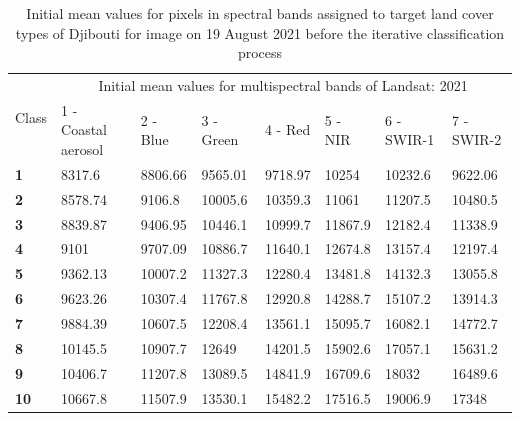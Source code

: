 \documentclass[jimaging,article,submit,pdftex,moreauthors]{Definitions/mdpi}
\begin{document}
\begin{table}[H]
  \centering
  \begin{tabularx}{\textwidth}{p{0.7cm}p{2.5cm}p{1.0cm}p{1.3cm}p{1.0cm}p{1.0cm}p{1.5cm}p{1.5cm}}
  \toprule
  \multirow{2}{*}{Class} & \multicolumn{7}{c}{Initial mean values for multispectral bands of Landsat: 2021} \\
     & 1 - Coastal aerosol & 2 - Blue & 3 - Green & 4 - Red & 5 - NIR & 6 - SWIR-1 & 7 - SWIR-2 \\
    \midrule
    \textbf{1} & 8317.6 & 8806.66 & 9565.01 & 9718.97 & 10254 & 10232.6 & 9622.06 \\
    \textbf{2} & 8578.74 & 9106.8 & 10005.6 & 10359.3 & 11061 & 11207.5 & 10480.5 \\
    \textbf{3} & 8839.87 & 9406.95 & 10446.1 & 10999.7 & 11867.9 & 12182.4 & 11338.9 \\
    \textbf{4} & 9101 & 9707.09 & 10886.7 & 11640.1 & 12674.8 & 13157.4 & 12197.4 \\
    \textbf{5} & 9362.13 &10007.2 & 11327.3 & 12280.4 & 13481.8 & 14132.3 & 13055.8 \\
    \textbf{6} & 9623.26 & 10307.4 & 11767.8 & 12920.8 & 14288.7 & 15107.2 & 13914.3 \\
    \textbf{7} & 9884.39 & 10607.5 & 12208.4 & 13561.1 & 15095.7 & 16082.1 & 14772.7 \\
    \textbf{8} & 10145.5 & 10907.7 & 12649 & 14201.5 & 15902.6 & 17057.1 & 15631.2 \\
    \textbf{9} & 10406.7 & 11207.8 & 13089.5 & 14841.9 & 16709.6 & 18032 & 16489.6 \\
    \textbf{10} & 10667.8 & 11507.9 & 13530.1 & 15482.2 & 17516.5 & 19006.9 & 17348 \\
\bottomrule
\end{tabularx}
  \caption{Initial mean values for pixels in spectral bands assigned to target land cover types of Djibouti for image on 19 August 2021 before the iterative classification process}
  \label{tabA3} 
\end{table}
\end{document}
